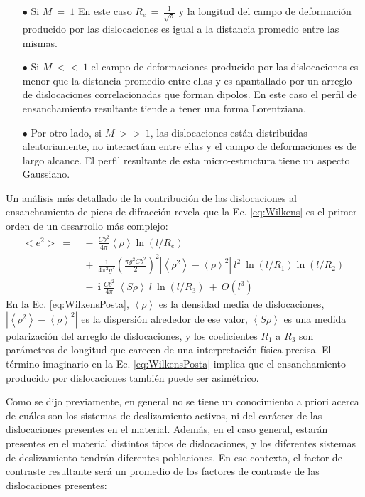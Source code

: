 \begin{itemize}
  \item[$\bullet$] Si $M \ = \ 1 $ En este caso $R_e\,=\,\frac{1}{\sqrt{\rho}}$ y la longitud del campo de deformación producido por las dislocaciones es igual a la distancia promedio entre las mismas.
  \item[$\bullet$] Si $M \ << \ 1 $ el campo de deformaciones producido por las dislocaciones es menor que la distancia promedio entre ellas y es apantallado por un arreglo de dislocaciones correlacionadas que forman dipolos. En este caso el perfil de ensanchamiento resultante tiende a tener una forma Lorentziana.
  \item[$\bullet$] Por otro lado, si $M \ >> \ 1 $, las dislocaciones están distribuidas aleatoriamente, no interactúan entre ellas y el campo de deformaciones es de largo alcance. El perfil resultante de esta micro-estructura tiene un aspecto Gaussiano.
\end{itemize}

Un análisis más detallado de la contribución de las dislocaciones al ensanchamiento de picos de difracción revela que la Ec. \ref{eq:Wilkens} es el primer orden de un desarrollo más complejo\cite{Groma1988}:
\begin{equation}
  \begin{split}
      <e^2> \ = & \ - \ \frac{Cb^2}{4 \pi}\left< \rho \right> \ln \left( l/R_e \right) \ \\
     & \ +  \ \frac{1}{4\pi^2g^2} \left( \frac{\pi g^2 C b^2}{2} \right)^2 |\left<\rho^2\right> - \left< \rho \right>^2| \ l^2 \ \ln(l/R_1) \ln(l/R_2) \ \\
     & \ - \ \mathbf{i} \ \frac{Cb^2}{4\pi} \ \left< S\rho \right> \ l \ \ln(l/R_3) \ + \ O(l^3)
  \end{split}
  \label{eq:WilkensPosta}
\end{equation}
\noindent
En la Ec. \ref{eq:WilkensPosta}, $\left< \rho \right>$ es la densidad media de dislocaciones, $|\left<\rho^2\right> - \left< \rho \right>^2|$ es la dispersión alrededor de ese valor, $\left< S\rho \right>$ es una medida polarización del arreglo de dislocaciones, y los coeficientes $R_1$ a $R_3$ son parámetros de longitud que carecen de una interpretación física precisa.
El término imaginario en la Ec. \ref{eq:WilkensPosta} implica que el ensanchamiento producido por dislocaciones también puede ser asimétrico.

Como se dijo previamente, en general no se tiene un conocimiento a priori acerca de cuáles son los sistemas de deslizamiento activos, ni del carácter de las dislocaciones presentes en el material. Además, en el caso general, estarán presentes en el material distintos tipos de dislocaciones, y los diferentes sistemas de deslizamiento tendrán diferentes poblaciones. En ese contexto, el factor de contraste resultante será un promedio de los factores de contraste de las dislocaciones presentes:

